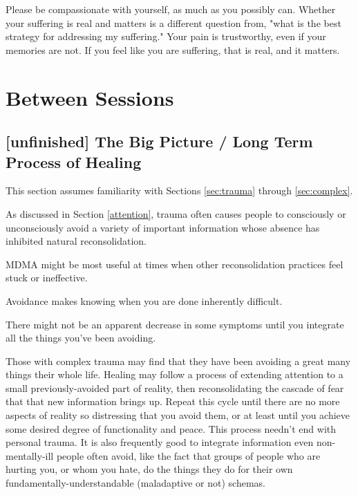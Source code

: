 \documentclass[12pt,letterpaper]{book}
\begin{document}
Please be compassionate with yourself, as much as you possibly can. Whether your suffering is real and matters is a different question from, "what is the best strategy for addressing my suffering." Your pain is trustworthy, even if your memories are not. If you feel like you are suffering, that is real, and it matters.
\chapter{Between Sessions}
\section{[unfinished] The Big Picture / Long Term Process of Healing}
\label{bigPicture}
This section assumes familiarity with Sections \ref{sec:trauma} through \ref{sec:complex}.

As discussed in Section \ref{attention}, trauma often causes people to consciously or unconsciously avoid a variety of important information whose absence has inhibited natural reconsolidation.

MDMA might be most useful at times when other reconsolidation practices feel stuck or ineffective.

Avoidance makes knowing when you are done inherently difficult.

There might not be an apparent decrease in some symptoms until you integrate all the things you've been avoiding.

Those with complex trauma may find that they have been avoiding a great many things their whole life. Healing may follow a process of extending attention to a small previously-avoided part of reality, then reconsolidating the cascade of fear that that new information brings up. Repeat this cycle until there are no more aspects of reality so distressing that you avoid them, or at least until you achieve some desired degree of functionality and peace. This process needn't end with personal trauma. It is also frequently good to integrate information even non-mentally-ill people often avoid, like the fact that groups of people who are hurting you, or whom you hate, do the things they do for their own fundamentally-understandable (maladaptive or not) schemas.
\end{document}

